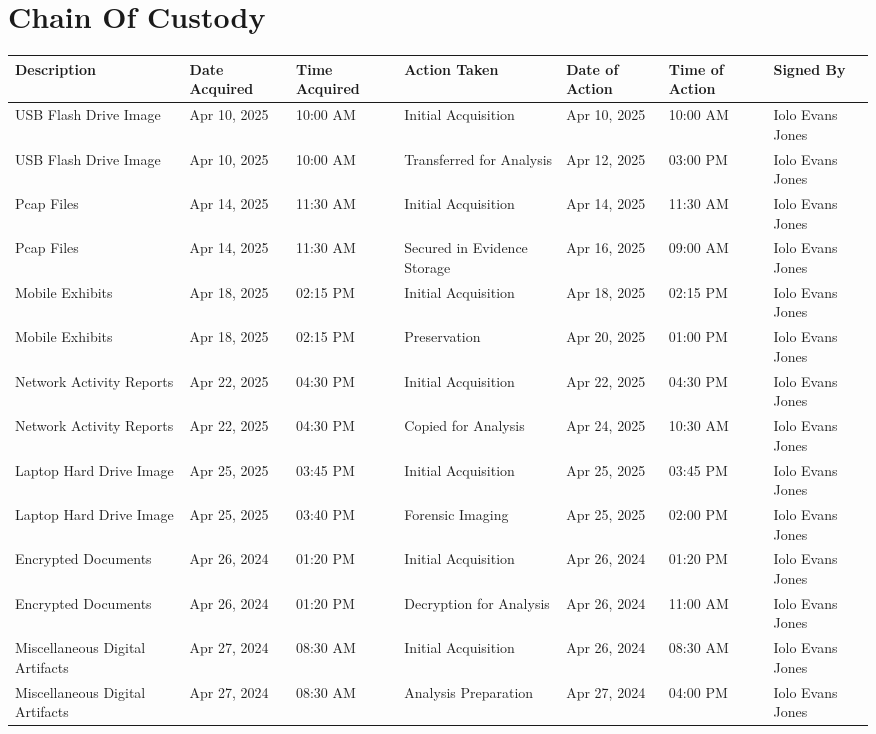 
\chapter{Chain Of Custody}

\begin{longtable}{|p{2.3cm}|p{1.8cm}|p{1.8cm}|p{2.7cm}|p{1.8cm}|p{1.8cm}|p{1.8cm}|}
  \hline
  \textbf{Description} & \textbf{Date Acquired} & \textbf{Time Acquired} & \textbf{Action Taken} & \textbf{Date of Action} & \textbf{Time of Action} & \textbf{Signed By} \\
  \hline
  \endhead
  
  USB Flash Drive Image & Apr 10, 2025 & 10:00 AM & Initial Acquisition & Apr 10, 2025 & 10:00 AM & Iolo Evans Jones \\
  \hline
  USB Flash Drive Image & Apr 10, 2025 & 10:00 AM & Transferred for Analysis & Apr 12, 2025 & 03:00 PM & Iolo Evans Jones \\
  \hline
  Pcap Files & Apr 14, 2025 & 11:30 AM & Initial Acquisition & Apr 14, 2025 & 11:30 AM & Iolo Evans Jones \\
  \hline
  Pcap Files & Apr 14, 2025 & 11:30 AM & Secured in Evidence Storage & Apr 16, 2025 & 09:00 AM & Iolo Evans Jones \\
  \hline
  Mobile Exhibits & Apr 18, 2025 & 02:15 PM & Initial Acquisition & Apr 18, 2025 & 02:15 PM & Iolo Evans Jones \\
  \hline
  Mobile Exhibits & Apr 18, 2025 & 02:15 PM & Preservation & Apr 20, 2025 & 01:00 PM & Iolo Evans Jones \\
  \hline
  Network Activity Reports & Apr 22, 2025 & 04:30 PM & Initial Acquisition & Apr 22, 2025 & 04:30 PM & Iolo Evans Jones \\
  \hline
  Network Activity Reports & Apr 22, 2025 & 04:30 PM & Copied for Analysis & Apr 24, 2025 & 10:30 AM & Iolo Evans Jones \\
  \hline
  Laptop Hard Drive Image & Apr 25, 2025 & 03:45 PM & Initial Acquisition & Apr 25, 2025 & 03:45 PM & Iolo Evans Jones \\
  \hline
  Laptop Hard Drive Image & Apr 25, 2025 & 03:40 PM & Forensic Imaging & Apr 25, 2025 & 02:00 PM & Iolo Evans Jones \\
  \hline
  Encrypted Documents & Apr 26, 2024 & 01:20 PM & Initial Acquisition & Apr 26, 2024 & 01:20 PM & Iolo Evans Jones \\
  \hline
  Encrypted Documents & Apr 26, 2024 & 01:20 PM & Decryption for Analysis & Apr 26, 2024 & 11:00 AM & Iolo Evans Jones \\
  \hline
  Miscellaneous Digital Artifacts & Apr 27, 2024 & 08:30 AM & Initial Acquisition & Apr 26, 2024 & 08:30 AM & Iolo Evans Jones \\
  \hline
  Miscellaneous Digital Artifacts & Apr 27, 2024 & 08:30 AM & Analysis Preparation & Apr 27, 2024 & 04:00 PM & Iolo Evans Jones \\
  \hline
  \end{longtable}